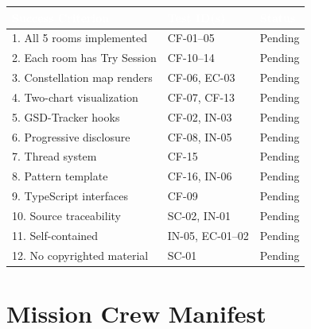 \documentclass[11pt,letterpaper]{article}
\newcommand{\tableheader}[1]{\textbf{\sffamily\textcolor{white}{#1}}}
\begin{document}
\begin{center}
\begin{tabularx}{\textwidth}{XL{3cm}C{1.5cm}}
\toprule
{}
\tableheader{Success Criterion} & \tableheader{Test ID(s)} & \tableheader{Status} \\
. All 5 rooms implemented & CF-01--05 & Pending \\
2. Each room has Try Session & CF-10--14 & Pending \\
3. Constellation map renders & CF-06, EC-03 & Pending \\
4. Two-chart visualization & CF-07, CF-13 & Pending \\
5. GSD-Tracker hooks & CF-02, IN-03 & Pending \\
6. Progressive disclosure & CF-08, IN-05 & Pending \\
7. Thread system & CF-15 & Pending \\
8. Pattern template & CF-16, IN-06 & Pending \\
9. TypeScript interfaces & CF-09 & Pending \\
10. Source traceability & SC-02, IN-01 & Pending \\
11. Self-contained & IN-05, EC-01--02 & Pending \\
12. No copyrighted material & SC-01 & Pending \\
\bottomrule
\end{tabularx}
\end{center}

\section{Mission Crew Manifest}
\end{document}
